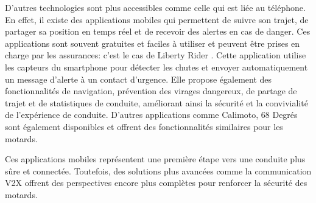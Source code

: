 D'autres technologies sont plus accessibles comme celle qui est liée au téléphone. En effet, il existe des applications mobiles qui permettent de suivre son trajet, de partager sa position en temps réel et de recevoir des alertes en cas de danger. Ces applications sont souvent gratuites et faciles à utiliser et peuvent être prises en charge par les assurances: c'est le cas de Liberty Rider \cite{liberty_rider}. Cette application utilise les capteurs du smartphone pour détecter les chutes et envoyer automatiquement un message d'alerte à un contact d’urgence. Elle propose également des fonctionnalités de navigation, prévention des virages dangereux, de partage de trajet et de statistiques de conduite, améliorant ainsi la sécurité et la convivialité de l’expérience de conduite. D'autres applications comme Calimoto, 68 Degrés sont également disponibles et offrent des fonctionnalités similaires pour les motards.
\vspace{0.5cm}

Ces applications mobiles représentent une première étape vers une conduite plus sûre et connectée. Toutefois, des solutions plus avancées comme la communication V2X offrent des perspectives encore plus complètes pour renforcer la sécurité des motards.
\vspace{0.5cm}

